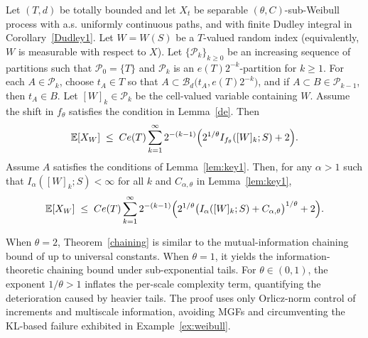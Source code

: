\documentclass[11pt]{article}
\begin{document}
\begin{theorem}\label{chaining}
 Let $(T,d)$ be totally bounded and let $X_t$ be separable
$(\theta,C)$-sub-Weibull process with a.s. uniformly continuous paths, and with finite
Dudley integral in Corollary~\ref{Dudley1}. Let $W=W(S)$ be a $T$-valued random
index (equivalently, $W$ is measurable with respect to $X$). Let
$\{\mathcal{P}_k\}_{k\ge 0}$ be an increasing sequence of partitions such that
$\mathcal{P}_0=\{T\}$ and $\mathcal{P}_k$ is an $e(T)2^{-k}$-partition for $k\ge 1$.
For each $A\in\mathcal{P}_k$, choose $t_A\in T$ so that
$A\subset \mathcal{B}_d\bigl(t_A,e(T)2^{-k}\bigr)$, and if $A\subset B\in \mathcal{P}_{k-1}$, then $t_A\in B$. Let $[W]_k\in\mathcal P_k$ be the cell-valued variable containing $W$. Assume the shift in $f_\theta$ satisfies the condition in Lemma~\ref{de}. Then
\[
\mathbb{E}[X_W]
\;\le\;
Ce(T)\sum_{k=1}^\infty 2^{-(k-1)}
\Bigl(2^{1/\theta}I_{f_\theta}([W]_k;S)+2\Bigr).
\]
Assume $A$ satisfies the conditions of Lemma~\ref{lem:key1}. Then, for any
$\alpha>1$ such that $I_\alpha([W]_k;S)<\infty$ for all $k$ and $C_{\alpha,\theta}$ in Lemma~\ref{lem:key1},
\begin{equation}\label{computmeth3}
\mathbb{E}[X_W]
\;\le\;
Ce(T)\sum_{k=1}^\infty 2^{-(k-1)}
\Bigl(
2^{1/\theta}\bigl(I_\alpha([W]_k;S)+C_{\alpha,\theta}\bigr)^{1/\theta}
+2
\Bigr).
\end{equation}
\end{theorem}

When $\theta=2$, Theorem~\ref{chaining} is similar to the mutual-information chaining
bound of \citet[Theorem 4]{asadi2018chaining} up to universal constants.  When
$\theta=1$, it yields the information-theoretic chaining bound under
sub-exponential tails.  For $\theta\in(0,1)$, the exponent $1/\theta>1$ inflates
the per-scale complexity term, quantifying the deterioration caused by heavier
tails.  The proof uses only Orlicz-norm control of increments and multiscale
information, avoiding MGFs and circumventing the KL-based failure exhibited in
Example~\ref{ex:weibull}.


\end{document}

